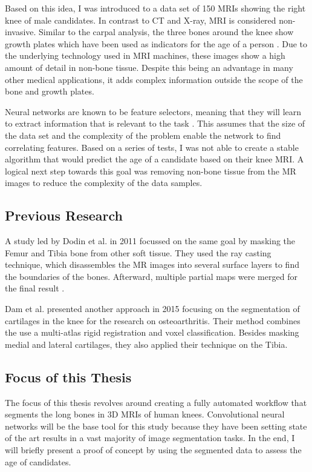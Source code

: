 Based on this idea, I was introduced to a data set of 150 MRIs showing the right knee of male candidates. In contrast to CT and X-ray, MRI is considered non-invasive. Similar to the carpal analysis, the three bones around the knee show growth plates which have been used as indicators for the age of a person \cite{Saring2014}. Due to the underlying technology used in MRI machines, these images show a high amount of detail in non-bone tissue. Despite this being an advantage in many other medical applications, it adds complex information outside the scope of the bone and growth plates.

Neural networks are known to be feature selectors, meaning that they will learn to extract information that is relevant to the task \cite{Setiono1997}. This assumes that the size of the data set and the complexity of the problem enable the network to find correlating features. Based on a series of tests, I was not able to create a stable algorithm that would predict the age of a candidate based on their knee MRI. A logical next step towards this goal was removing non-bone tissue from the MR images to reduce the complexity of the data samples.

\subsection{Previous Research}

A study led by Dodin et al. in 2011 focussed on the same goal by masking the Femur and Tibia bone from other soft tissue. They used the ray casting technique, which disassembles the MR images into several surface layers to find the boundaries of the bones. Afterward, multiple partial maps were merged for the final result \cite{Dodin2011}.

Dam et al. presented another approach in 2015 focusing on the segmentation of cartilages in the knee for the research on osteoarthritis. Their method combines the use a multi-atlas rigid registration and voxel classification. Besides masking medial and lateral cartilages, they also applied their technique on the Tibia.

\subsection{Focus of this Thesis}

The focus of this thesis revolves around creating a fully automated workflow that segments the long bones in 3D MRIs of human knees. Convolutional neural networks will be the base tool for this study because they have been setting state of the art results in a vast majority of image segmentation tasks. In the end, I will briefly present a proof of concept by using the segmented data to assess the age of candidates.

\newpage
